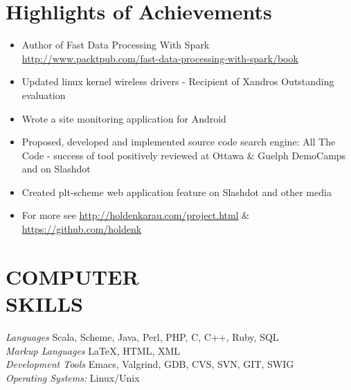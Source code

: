 \documentclass[10pt,line,margin=0.1]{newsres}
\begin{document}
\address{3407 24th St, Apt \#2, San Francisco, CA, USA}
\address{E-mail: holden@pigscanfly.ca, Cell: (425) 233-8271}
 
\begin{resume}
  
 \section{Highlights of Achievements}
\begin{itemize}  \itemsep -2pt %
\item{Author of  Fast Data Processing With Spark \\ \url{http://www.packtpub.com/fast-data-processing-with-spark/book}}
\item{Updated linux kernel wireless drivers - Recipient of Xandros Outstanding evaluation}
\item{Wrote a site monitoring application for Android}
\item{Proposed, developed and implemented source code search engine: All The Code - success of tool positively reviewed at Ottawa \& Guelph DemoCamps and on Slashdot}
\item{Created plt-scheme web application feature on Slashdot and other media}
\item{For more see \url{http://holdenkarau.com/project.html} \& \url{https://github.com/holdenk}}
\end{itemize}
\section{COMPUTER \\ SKILLS} {\sl Languages} Scala, Scheme, Java, Perl, PHP, C, C++, Ruby, SQL \\ %
                {\sl Markup Languages} \LaTeX , HTML, XML \\
                {\sl Development Tools} Emacs, Valgrind, GDB, CVS, SVN, GIT, SWIG \\
                {\sl Operating Systems:}  Linux/Unix \\
 

\end{resume}
\end{document}

